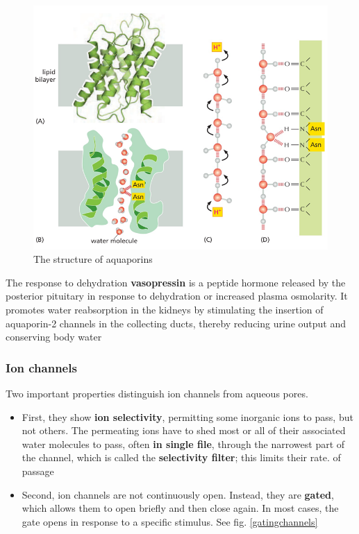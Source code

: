 \documentclass[../main.tex]{subfiles}
\begin{document}
\begin{figure}[H]
	\centering
	\includegraphics[width = 0.7 \textwidth]{19}
	\caption{The structure of aquaporins}
	\label{aquaporins}
\end{figure}

\begin{RemarkWithTitel}{The response to dehydration}
	\textbf{\gls{vasopressin}} is a peptide hormone released by the posterior pituitary in response to dehydration or increased plasma osmolarity. It promotes water reabsorption in the kidneys by stimulating the insertion of aquaporin-2 channels in the collecting ducts, thereby reducing urine output and conserving body water
\end{RemarkWithTitel}

\subsubsection{Ion channels}
Two important properties distinguish ion channels from aqueous pores.
\begin{itemize}
	\item  First, they show \textbf{ion selectivity}, permitting some inorganic ions to pass, but not others. The permeating ions have to shed most or all of their associated water molecules to pass, often \textbf{in single file}, through the narrowest part of the channel, which is called the \textbf{selectivity filter}; this limits their rate. 
	of passage
	
	\item Second, ion channels are not continuously open. Instead, they are \textbf{gated}, which allows them to open briefly and then close again. In most cases, the gate opens in response 
	to a specific stimulus. See fig. \ref{gatingchannels}
\end{itemize} 
\end{document}

